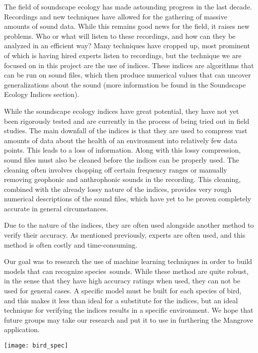 The field of soundscape ecology has made astounding progress in the last decade.
Recordings and new techniques have allowed for the gathering of massive amounts of sound data. While this remains good news for the field, it raises new problems. Who or what will listen to these recordings, and how can they be analyzed in an efficient way? Many techniques have cropped up, most prominent of which is having hired experts listen to recordings, but the technique we are focused on in this project are the use of indices. These indices are algorithms that can be run on sound files, which then produce numerical values that can uncover generalizations about the sound (more information be found in the Soundscape Ecology Indices section).\par
While the soundscape ecology indices have great potential, they have not yet been rigorously tested and are currently in the process of being tried out in field studies. The main downfall of the indices is that they are used to compress vast amounts of data about the health of an environment into relatively few data points. This leads to a loss of information. Along with this lossy compression, sound files must also be cleaned before the indices can be properly used. The cleaning often involves chopping off certain frequency ranges or manually removing geophonic and anthrophonic sounds in the recording. This cleaning, combined with the already lossy nature of the indices, provides very rough numerical descriptions of the sound files, which have yet to be proven completely accurate in general circumstances.\par
Due to the nature of the indices, they are often used alongside another method to verify their accuracy. As mentioned previously, experts are often used, and this method is often costly and time-consuming.\par
Our goal was to research the use of machine learning techniques in order to build models that can recognize species\textquotesingle\ sounds. While these method are quite robust, in the sense that they have high accuracy ratings when used, they can not be used for general cases. A specific model must be built for each species of bird, and this makes it less than ideal for a substitute for the indices, but an ideal technique for verifying the indices results in a specific environment. We hope that future groups may take our research and put it to use in furthering the Mangrove application.\par
\begin{center}
	\texttt{[image: bird\_spec]}
\end{center}
